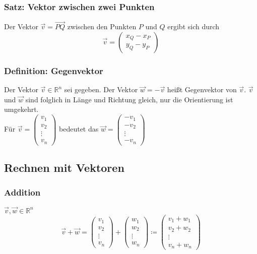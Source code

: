 \documentclass{article}
\begin{document}
  \subsubsection{Satz: Vektor zwischen zwei Punkten}
  Der Vektor $\vec{v} = \vec{PQ}$ zwischen den Punkten $P$ und $Q$ ergibt sich durch 
  \begin{equation*}
  	\vec{v} = 
  	\begin{pmatrix}
  		x_Q - x_P \\
  		y_Q - y_P
  	\end{pmatrix}
  \end{equation*}
  
  \subsubsection{Definition: Gegenvektor}
  Der Vektor $\vec{v} \in \mathbb{R}^n$ sei gegeben. Der Vektor $\vec{w} = -\vec{v}$ heißt Gegenvektor von $\vec{v}$. $\vec{v}$ und $\vec{w}$ sind folglich in Länge und Richtung gleich, nur die Orientierung ist umgekehrt. \\
  Für $\vec{v} = 
  \begin{pmatrix}
  	v_1 \\
  	v_2 \\
  	\vdots \\
  	v_n
  \end{pmatrix}$
  bedeutet das $\vec{w} =
  \begin{pmatrix}
  	-v_1 \\
  	-v_2 \\
  	\vdots \\
  	-v_n
  \end{pmatrix}$
  
  \subsection{Rechnen mit Vektoren}
  
  \subsubsection{Addition}
  $\vec{v}, \vec{w} \in \mathbb{R}^n$
  \begin{equation*}
  	\vec{v} + \vec{w} = 
  	\begin{pmatrix}
  		v_1 \\
  		v_2 \\
  		\vdots \\
  		v_n
  	\end{pmatrix}
  	+
  	\begin{pmatrix}
  		w_1 \\
  		w_2 \\
  		\vdots \\
  		w_n
  	\end{pmatrix}
  	\coloneqq 
  	\begin{pmatrix}
  		v_1 + w_1 \\
  		v_2 + w_2 \\
  		\vdots \\
  		v_n + w_n
  	\end{pmatrix}
  \end{equation*}
  
\end{document}
